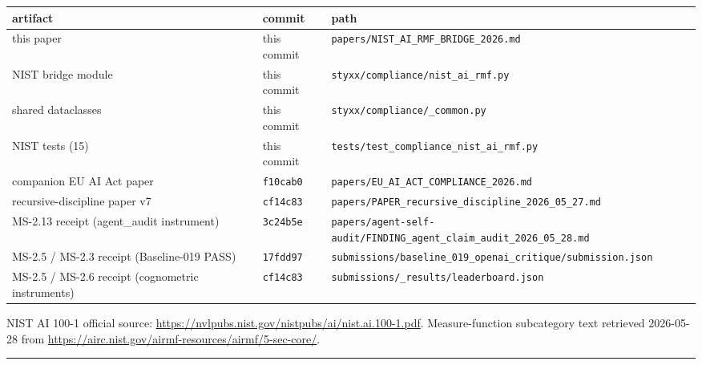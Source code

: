 \documentclass[
]{article}
\newcounter{none} %
\begin{document}
{\def\LTcaptype{none} %
\begin{longtable}[]{@{}
  >{\raggedright\arraybackslash}p{}
  >{\raggedright\arraybackslash}p{}
  >{\raggedright\arraybackslash}p{}@{}}
\toprule\noalign{}
\begin{minipage}[b]{\linewidth}\raggedright
artifact
\end{minipage} & \begin{minipage}[b]{\linewidth}\raggedright
commit
\end{minipage} & \begin{minipage}[b]{\linewidth}\raggedright
path
\end{minipage} \\
\midrule\noalign{}
\endhead
\bottomrule\noalign{}
\endlastfoot
this paper & this commit &
\texttt{papers/NIST\_AI\_RMF\_BRIDGE\_2026.md} \\
NIST bridge module & this commit &
\texttt{styxx/compliance/nist\_ai\_rmf.py} \\
shared dataclasses & this commit &
\texttt{styxx/compliance/\_common.py} \\
NIST tests (15) & this commit &
\texttt{tests/test\_compliance\_nist\_ai\_rmf.py} \\
companion EU AI Act paper & \texttt{f10cab0} &
\texttt{papers/EU\_AI\_ACT\_COMPLIANCE\_2026.md} \\
recursive-discipline paper v7 & \texttt{cf14c83} &
\texttt{papers/PAPER\_recursive\_discipline\_2026\_05\_27.md} \\
MS-2.13 receipt (agent\_audit instrument) & \texttt{3c24b5e} &
\texttt{papers/agent-self-audit/FINDING\_agent\_claim\_audit\_2026\_05\_28.md} \\
MS-2.5 / MS-2.3 receipt (Baseline-019 PASS) & \texttt{17fdd97} &
\texttt{submissions/baseline\_019\_openai\_critique/submission.json} \\
MS-2.5 / MS-2.6 receipt (cognometric instruments) & \texttt{cf14c83} &
\texttt{submissions/\_results/leaderboard.json} \\
\end{longtable}
}

NIST AI 100-1 official source:
\url{https://nvlpubs.nist.gov/nistpubs/ai/nist.ai.100-1.pdf}.
Measure-function subcategory text retrieved 2026-05-28 from
\url{https://airc.nist.gov/airmf-resources/airmf/5-sec-core/}.

\begin{center}\rule{0.5\linewidth}{0.5pt}\end{center}
\end{document}
